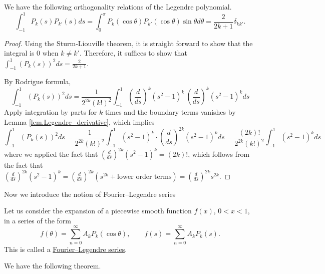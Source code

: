 \begin{proposition}[]
We have the following orthogonality relations of the Legendre polynomial.
\begin{equation}\label{eq.Legendre_orthogonality}
    \int_{-1}^1 P_k(s) P_{k'}(s) d s=\int_0^\pi P_k(\cos \theta) P_{k'}(\cos \theta) \sin \theta d \theta=\frac{2}{2k+1}\delta_{kk'}.
\end{equation}
\end{proposition}
\begin{proof} 
Using the Sturm-Liouville theorem, it is straight forward to show that the integral is 0 when $k\neq k'$. Therefore, it suffices to show that $\int_{-1}^1 (P_k(s))^2 d s = \frac{2}{2k+1}$.

By Rodrigue formula, 
\begin{equation}\label{eq.proof_orthogonal_Legendre_1}
    \int_{-1}^1 (P_k(s))^2 d s = \frac{1}{2^{2k} (k!)^2}\int_{-1}^1\left(\frac{d}{d s}\right)^k\left(s^2-1\right)^k\ \left(\frac{d}{d s}\right)^k\left(s^2-1\right)^k d s
\end{equation}
Apply integration by parts for $k$ times and the boundary terms vanishes by Lemma \ref{lem.Legendre_derivative}, which implies
\begin{equation}\label{eq.proof_orthogonal_Legendre_2}
    \int_{-1}^1 (P_k(s))^2 d s = \frac{1}{2^{2k} (k!)^2}\int_{-1}^1 \left(s^2-1\right)^k\cdot \left(\frac{d}{d s}\right)^{2k}\left(s^2-1\right)^k d s = \frac{(2k)!}{2^{2k} (k!)^2}\int_{-1}^1 \left(s^2-1\right)^k d s
\end{equation}
where we applied the fact that $\left(\frac{d}{d s}\right)^{2k}\left(s^2-1\right)^k = (2k)!$, which follows from the fact that $\left(\frac{d}{d s}\right)^{2k}\left(s^2-1\right)^k = \left(\frac{d}{d s}\right)^{2k}(s^{2k} + \textrm{lower order terms}) = \left(\frac{d}{d s}\right)^{2k} s^{2k}$.
\end{proof}

Now we introduce the notion of Fourier--Legendre series

\begin{definition}
Let us consider the expansion of a piecewise smooth function $f(x)$, $0<x<1$, in a series of the form
$$
f(\theta)=\sum_{n=0}^{\infty} A_k P_k(\cos \theta), \qquad f(s)=\sum_{n=0}^{\infty} A_k P_k(s).
$$ 
This is called a \underline{Fourier--Legendre series}. 
\end{definition}

We have the following theorem.

